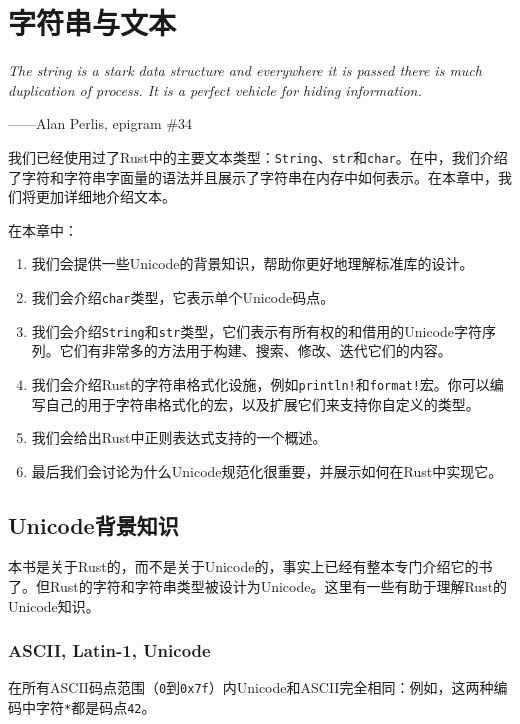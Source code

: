 \chapter{字符串与文本}\label{ch17}

\emph{The string is a stark data structure and everywhere it is passed there is much duplication of process. It is a perfect vehicle for hiding information.}
\begin{flushright}
    ——Alan Perlis, epigram \#34
\end{flushright}

我们已经使用过了Rust中的主要文本类型：\texttt{String}、\texttt{str}和\texttt{char}。在中，我们介绍了字符和字符串字面量的语法并且展示了字符串在内存中如何表示。在本章中，我们将更加详细地介绍文本。

在本章中：
\begin{enumerate}
    \item 我们会提供一些Unicode的背景知识，帮助你更好地理解标准库的设计。
    \item 我们会介绍\texttt{char}类型，它表示单个Unicode码点。
    \item 我们会介绍\texttt{String}和\texttt{str}类型，它们表示有所有权的和借用的Unicode字符序列。它们有非常多的方法用于构建、搜索、修改、迭代它们的内容。
    \item 我们会介绍Rust的字符串格式化设施，例如\texttt{println!}和\texttt{format!}宏。你可以编写自己的用于字符串格式化的宏，以及扩展它们来支持你自定义的类型。
    \item 我们会给出Rust中正则表达式支持的一个概述。
    \item 最后我们会讨论为什么Unicode规范化很重要，并展示如何在Rust中实现它。
\end{enumerate}

\section{Unicode背景知识}

本书是关于Rust的，而不是关于Unicode的，事实上已经有整本专门介绍它的书了。但Rust的字符和字符串类型被设计为Unicode。这里有一些有助于理解Rust的Unicode知识。

\subsection{ASCII, Latin-1, Unicode}
在所有ASCII码点范围（\texttt{0}到\texttt{0x7f}）内Unicode和ASCII完全相同：例如，这两种编码中字符\texttt{*}都是码点\texttt{42}。

